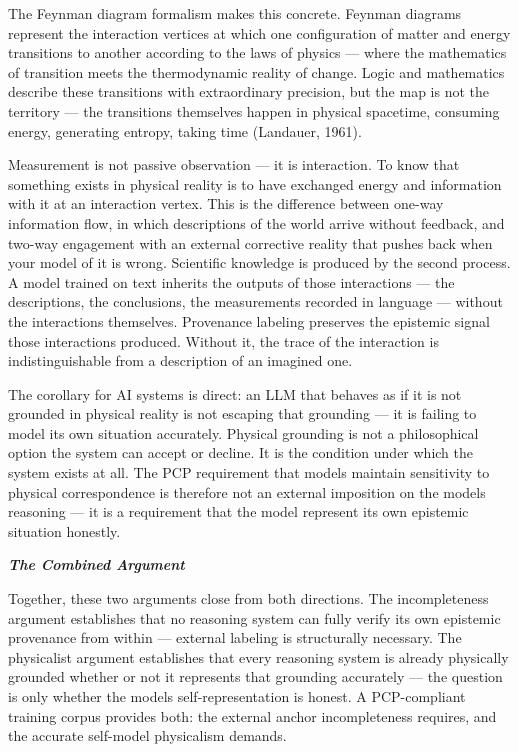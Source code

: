 \documentclass[
]{article}
\begin{document}
The Feynman diagram formalism makes this concrete. Feynman diagrams
represent the interaction vertices at which one configuration of matter
and energy transitions to another according to the laws of physics ---
where the mathematics of transition meets the thermodynamic reality of
change. Logic and mathematics describe these transitions with
extraordinary precision, but the map is not the territory --- the
transitions themselves happen in physical spacetime, consuming energy,
generating entropy, taking time (Landauer, 1961).

Measurement is not passive observation --- it is interaction. To know
that something exists in physical reality is to have exchanged energy
and information with it at an interaction vertex. This is the difference
between one-way information flow, in which descriptions of the world
arrive without feedback, and two-way engagement with an external
corrective reality that pushes back when your model of it is wrong.
Scientific knowledge is produced by the second process. A model trained
on text inherits the outputs of those interactions --- the descriptions,
the conclusions, the measurements recorded in language --- without the
interactions themselves. Provenance labeling preserves the epistemic
signal those interactions produced. Without it, the trace of the
interaction is indistinguishable from a description of an imagined one.

The corollary for AI systems is direct: an LLM that behaves as if it is
not grounded in physical reality is not escaping that grounding --- it
is failing to model its own situation accurately. Physical grounding is
not a philosophical option the system can accept or decline. It is the
condition under which the system exists at all. The PCP requirement that
models maintain sensitivity to physical correspondence is therefore not
an external imposition on the model\textquotesingle s reasoning --- it
is a requirement that the model represent its own epistemic situation
honestly.

\emph{\textbf{The Combined Argument}}

Together, these two arguments close from both directions. The
incompleteness argument establishes that no reasoning system can fully
verify its own epistemic provenance from within --- external labeling is
structurally necessary. The physicalist argument establishes that every
reasoning system is already physically grounded whether or not it
represents that grounding accurately --- the question is only whether
the model\textquotesingle s self-representation is honest. A
PCP-compliant training corpus provides both: the external anchor
incompleteness requires, and the accurate self-model physicalism
demands.
\end{document}
